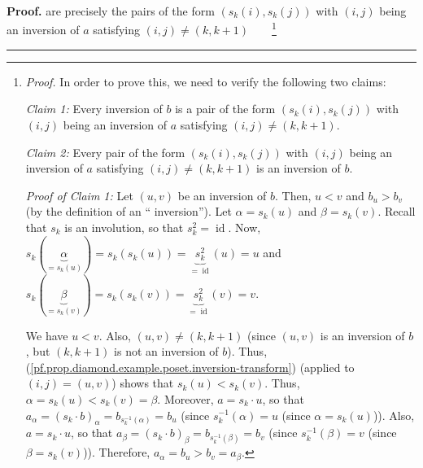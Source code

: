 \documentclass[numbers=enddot,12pt,final,onecolumn,notitlepage]{scrartcl}%
\theoremstyle{definition}
\newenvironment{proof}[1][Proof]{\noindent\textbf{#1.} }{\ \rule{0.5em}{0.5em}}
\newenvironment{verlong}{}{}
\begin{document}
\begin{proof}
\begin{verlong}
are precisely the pairs of the form $\left(  s_{k}\left(  i\right)
,s_{k}\left(  j\right)  \right)  $ with $\left(  i,j\right)  $ being an
inversion of $a$ satisfying $\left(  i,j\right)  \neq\left(  k,k+1\right)
$\ \ \ \ \footnote{\textit{Proof.} In order to prove this, we need to verify
the following two claims:
\par
\textit{Claim 1:} Every inversion of $b$ is a pair of the form $\left(
s_{k}\left(  i\right)  ,s_{k}\left(  j\right)  \right)  $ with $\left(
i,j\right)  $ being an inversion of $a$ satisfying $\left(  i,j\right)
\neq\left(  k,k+1\right)  $.
\par
\textit{Claim 2:} Every pair of the form $\left(  s_{k}\left(  i\right)
,s_{k}\left(  j\right)  \right)  $ with $\left(  i,j\right)  $ being an
inversion of $a$ satisfying $\left(  i,j\right)  \neq\left(  k,k+1\right)  $
is an inversion of $b$.
\par
\textit{Proof of Claim 1:} Let $\left(  u,v\right)  $ be an inversion of $b$.
Then, $u<v$ and $b_{u}>b_{v}$ (by the definition of an \textquotedblleft
inversion\textquotedblright). Let $\alpha=s_{k}\left(  u\right)  $ and
$\beta=s_{k}\left(  v\right)  $. Recall that $s_{k}$ is an involution, so that
$s_{k}^{2}=\operatorname*{id}$. Now, $s_{k}\left(  \underbrace{\alpha}%
_{=s_{k}\left(  u\right)  }\right)  =s_{k}\left(  s_{k}\left(  u\right)
\right)  =\underbrace{s_{k}^{2}}_{=\operatorname*{id}}\left(  u\right)  =u$
and $s_{k}\left(  \underbrace{\beta}_{=s_{k}\left(  v\right)  }\right)
=s_{k}\left(  s_{k}\left(  v\right)  \right)  =\underbrace{s_{k}^{2}%
}_{=\operatorname*{id}}\left(  v\right)  =v$.
\par
We have $u<v$. Also, $\left(  u,v\right)  \neq\left(  k,k+1\right)  $ (since
$\left(  u,v\right)  $ is an inversion of $b$, but $\left(  k,k+1\right)  $ is
not an inversion of $b$). Thus,
(\ref{pf.prop.diamond.example.poset.inversion-transform}) (applied to $\left(
i,j\right)  =\left(  u,v\right)  $) shows that $s_{k}\left(  u\right)
<s_{k}\left(  v\right)  $. Thus, $\alpha=s_{k}\left(  u\right)  <s_{k}\left(
v\right)  =\beta$. Moreover, $a=s_{k}\cdot u$, so that $a_{\alpha}=\left(
s_{k}\cdot b\right)  _{\alpha}=b_{s_{k}^{-1}\left(  \alpha\right)  }=b_{u}$
(since $s_{k}^{-1}\left(  \alpha\right)  =u$ (since $\alpha=s_{k}\left(
u\right)  $)). Also, $a=s_{k}\cdot u$, so that $a_{\beta}=\left(  s_{k}\cdot
b\right)  _{\beta}=b_{s_{k}^{-1}\left(  \beta\right)  }=b_{v}$ (since
$s_{k}^{-1}\left(  \beta\right)  =v$ (since $\beta=s_{k}\left(  v\right)  $)).
Therefore, $a_{\alpha}=b_{u}>b_{v}=a_{\beta}$.
\par
}
\end{verlong}
\end{proof}
\end{document}
